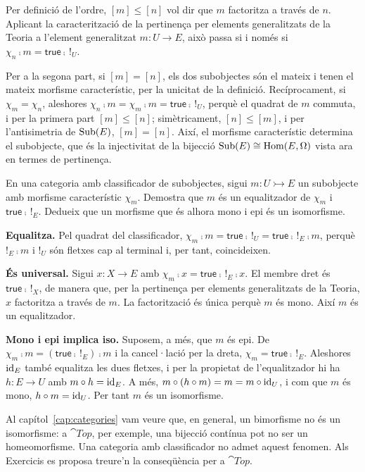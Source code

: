 \begin{solucio}
Per definició de l'ordre, $[m]\leq[n]$ vol dir que $m$ factoritza a través de $n$. Aplicant la caracterització de la pertinença per elements generalitzats de la Teoria a l'element generalitzat $m\colon U\to E$, això passa si i només si $\chi_n\comp m=\mathsf{true}\comp\,!_U$.

Per a la segona part, si $[m]=[n]$, els dos subobjectes són el mateix i tenen el mateix morfisme característic, per la unicitat de la definició. Recíprocament, si $\chi_m=\chi_n$, aleshores $\chi_n\comp m=\chi_m\comp m=\mathsf{true}\comp\,!_U$, perquè el quadrat de $m$ commuta, i per la primera part $[m]\leq[n]$; simètricament, $[n]\leq[m]$, i per l'antisimetria de $\operatorname{Sub}(E)$, $[m]=[n]$. Així, el morfisme característic determina el subobjecte, que és la injectivitat de la bijecció $\operatorname{Sub}(E)\cong\operatorname{Hom}(E,\Omega)$ vista ara en termes de pertinença.
\end{solucio}

\begin{exercici}\label{pr-mono-equalitzador}
En una categoria amb classificador de subobjectes, sigui $m\colon U\rightarrowtail E$ un subobjecte amb morfisme característic $\chi_m$. Demostra que $m$ és un equalitzador de $\chi_m$ i $\mathsf{true}\comp\,!_E$. Dedueix que un morfisme que és alhora mono i epi és un isomorfisme.
\end{exercici}

\begin{solucio}
\textbf{Equalitza.} Pel quadrat del classificador, $\chi_m\comp m=\mathsf{true}\comp\,!_U=\mathsf{true}\comp\,!_E\comp m$, perquè $!_E\comp m$ i $!_U$ són fletxes cap al terminal i, per tant, coincideixen.

\textbf{És universal.} Sigui $x\colon X\to E$ amb $\chi_m\comp x=\mathsf{true}\comp\,!_E\comp x$. El membre dret és $\mathsf{true}\comp\,!_X$, de manera que, per la pertinença per elements generalitzats de la Teoria, $x$ factoritza a través de $m$. La factorització és única perquè $m$ és mono. Així $m$ és un equalitzador.

\textbf{Mono i epi implica iso.} Suposem, a més, que $m$ és epi. De $\chi_m\comp m=(\mathsf{true}\comp\,!_E)\comp m$ i la cancel·lació per la dreta, $\chi_m=\mathsf{true}\comp\,!_E$. Aleshores $\operatorname{id}_E$ també equalitza les dues fletxes, i per la propietat de l'equalitzador hi ha $h\colon E\to U$ amb $m\circ h=\operatorname{id}_E$. A més, $m\circ(h\circ m)=m=m\circ\operatorname{id}_U$, i com que $m$ és mono, $h\circ m=\operatorname{id}_U$. Per tant $m$ és un isomorfisme.

Al capítol~\ref{cap:categories} vam veure que, en general, un bimorfisme no és un isomorfisme: a $\cat{Top}$, per exemple, una bijecció contínua pot no ser un homeomorfisme. Una categoria amb classificador no admet aquest fenomen. Als Exercicis es proposa treure'n la conseqüència per a $\cat{Top}$.
\end{solucio}

